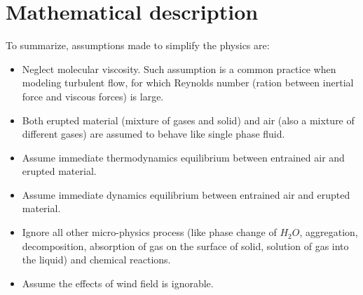 \section{Mathematical description}\label{sec:chp2-Mathematical-Description}

To summarize, assumptions made to simplify the physics are:
\begin{itemize}
\item Neglect molecular viscosity. Such assumption is a common practice when modeling turbulent flow, for which Reynolds number (ration between inertial force and viscous forces) is large.
\item Both erupted material (mixture of gases and solid) and air (also a mixture of different gases) are assumed to behave like single phase fluid.
\item Assume immediate thermodynamics equilibrium between entrained air and erupted material. 
\item Assume immediate dynamics equilibrium between entrained air and erupted material.
\item Ignore all other micro-physics process (like phase change of $H_2O$, aggregation, decomposition, absorption of gas on the surface of solid, solution of gas into the liquid) and chemical reactions.
\item Assume the effects of wind field is ignorable.
\end{itemize}

